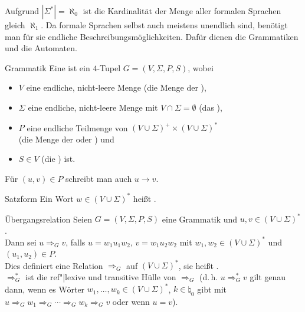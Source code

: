 \begin{Bem}
    Aufgrund $|\Sigma^\ast| = \aleph_0$ ist die Kardinalität der Menge aller
    formalen Sprachen gleich $\aleph_1$.
    Da formale Sprachen selbst auch meistens unendlich sind,
    benötigt man für sie endliche Beschreibungsmöglichkeiten.
    Dafür dienen die Grammatiken und die Automaten.
\end{Bem}

\linie

\begin{Def}{Grammatik}
    Eine  ist ein $4$-Tupel $G = (V, \Sigma, P, S)$, wobei
    \begin{itemize}
        \item
        $V$ eine endliche, nicht-leere Menge
        (die Menge der ),

        \item
        $\Sigma$ eine endliche, nicht-leere Menge mit
        $V \cap \Sigma = \emptyset$
        (das ),

        \item
        $P$ eine endliche Teilmenge von
        $(V \cup \Sigma)^+ \times (V \cup \Sigma)^\ast$\\
        (die Menge der  oder ) und

        \item
        $S \in V$ (die ) ist.
    \end{itemize}
    Für $(u, v) \in P$ schreibt man auch $u \rightarrow v$.
\end{Def}

\begin{Def}{Satzform}
    Ein Wort $w \in (V \cup \Sigma)^\ast$ heißt .
\end{Def}

\begin{Def}{Übergangsrelation}
    Seien $G = (V, \Sigma, P, S)$ eine Grammatik und
    $u, v \in (V \cup \Sigma)^\ast$.\\
    Dann sei $u \Rightarrow_G v$, falls
    $u = w_1 u_1 w_2$, $v = w_1 u_2 w_2$ mit
    $w_1, w_2 \in (V \cup \Sigma)^\ast$ und $(u_1, u_2) \in P$.\\
    Dies definiert eine Relation $\Rightarrow_G$
    auf $(V \cup \Sigma)^\ast$, sie heißt .\\
    $\Rightarrow_G^\ast$ ist die ref"|lexive und transitive Hülle von
    $\Rightarrow_G$
    (d.\,h. $u \Rightarrow_G^\ast v$ gilt genau dann, wenn es Wörter
    $w_1, \dotsc, w_k \in (V \cup \Sigma)^\ast$, $k \in \natural_0$ gibt mit
    $u \Rightarrow_G w_1 \Rightarrow_G \dotsb \Rightarrow_G w_k
    \Rightarrow_G v$ oder wenn $u = v$).
\end{Def}

